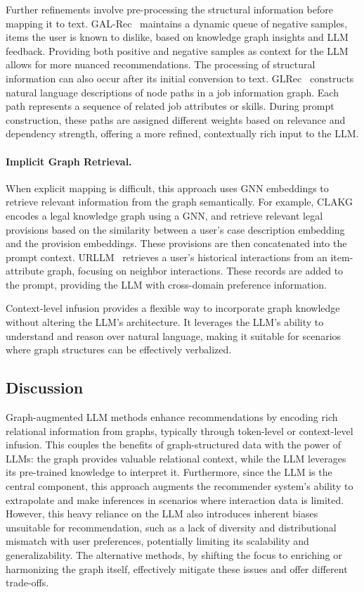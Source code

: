 Further refinements involve pre-processing the structural information before mapping it to text. GAL-Rec~\cite{guan2024enhancing} maintains a dynamic queue of negative samples, items the user is known to dislike, based on knowledge graph insights and LLM feedback. Providing both positive and negative samples as context for the LLM allows for more nuanced recommendations. The processing of structural information can also occur after its initial conversion to text. GLRec~\cite{wu2024exploring} constructs natural language descriptions of node paths in a job information graph. Each path represents a sequence of related job attributes or skills. During prompt construction, these paths are assigned different weights based on relevance and dependency strength, offering a more refined, contextually rich input to the LLM.

\paragraph{Implicit Graph Retrieval.} 
When explicit mapping is difficult, this approach uses GNN embeddings to retrieve relevant information from the graph semantically. For example, CLAKG~\cite{chen2024leverage} encodes a legal knowledge graph using a GNN, and retrieve relevant legal provisions based on the similarity between a user's case description embedding and the provision embeddings. These provisions are then concatenated into the prompt context. URLLM~\cite{shen2024exploring} retrieves a user's historical interactions from an item-attribute graph, focusing on neighbor interactions. These records are added to the prompt, providing the LLM with cross-domain preference information.

Context-level infusion provides a flexible way to incorporate graph knowledge without altering the LLM's architecture. It leverages the LLM's ability to understand and reason over natural language, making it suitable for scenarios where graph structures can be effectively verbalized.

\subsection{Discussion}
\label{subsec:discussion}

Graph-augmented LLM methods enhance recommendations by encoding rich relational information from graphs, typically through token-level or context-level infusion. This couples the benefits of graph-structured data with the power of LLMs: the graph provides valuable relational context, while the LLM leverages its pre-trained knowledge to interpret it. Furthermore, since the LLM is the central component, this approach augments the recommender system's ability to extrapolate and make inferences in scenarios where interaction data is limited. However, this heavy reliance on the LLM also introduces inherent biases unsuitable for recommendation, such as a lack of diversity and distributional mismatch with user preferences, potentially limiting its scalability and generalizability. The alternative methods, by shifting the focus to enriching or harmonizing the graph itself, effectively mitigate these issues and offer different trade-offs.